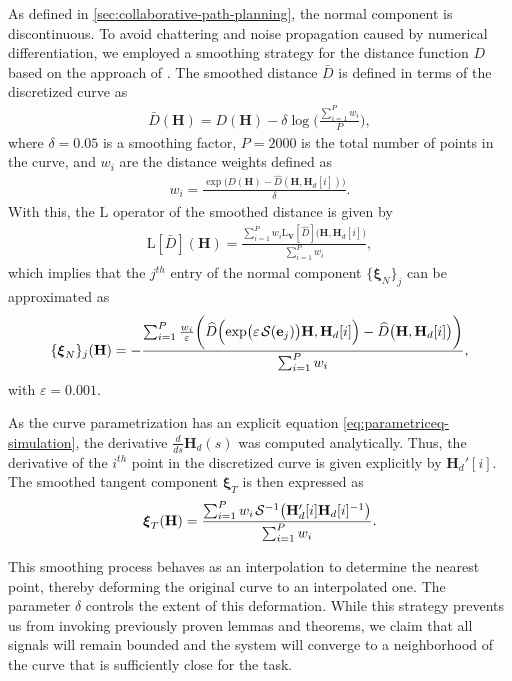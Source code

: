 As defined in \cref{sec:collaborative-path-planning}, the normal component is discontinuous. To avoid chattering and noise propagation caused by numerical differentiation, we employed a smoothing strategy for the distance function $D$ based on the approach of \citet{Goncalves2024}. The smoothed distance $\bar{D}$ is defined in terms of the discretized curve as
\begin{align}
    \bar{D}(\mathbf{H}) = D(\mathbf{H}) - \delta\log\biggl(\frac{\sum_{i=1}^{P}w_i}{P}\biggr),
\end{align}
where $\delta=0.05$ is a smoothing factor, $P=\num{2000}$ is the total number of points in the curve, and $w_i$ are the distance weights defined as
\begin{align}
    w_i = \frac{\exp\bigl(D(\mathbf{H}) - \widehat{D}(\mathbf{H}, \mathbf{H}_d[i])\bigr)}{\delta}.
\end{align}
With this, the $\text{L}$ operator of the smoothed distance is given by
\begin{align}
    \text{L}[\bar{D}](\mathbf{H}) = \frac{\sum_{i=1}^{P}w_i\text{L}_\mathbf{V}[\widehat{D}]\bigl(\mathbf{H}, \mathbf{H}_d[i]\bigr)}{\sum_{i=1}^{P}w_i},
\end{align}
which implies that the $j^{th}$ entry of the normal component $\{\boldsymbol{\xi}_{N}\}_{j}$ can be approximated as
\begin{align}
    \{\boldsymbol{\xi}_{N}\}_{j}(\mathbf{H}) = -\frac{\sum_{i=1}^{P} \frac{w_i}{\varepsilon}\biggl(\widehat{D}\Bigl(\exp\bigl(\varepsilon\SL[\mathbf{e}_j]\bigr)\mathbf{H}, \mathbf{H}_d[i]\Bigr)- \widehat{D}\bigl(\mathbf{H}, \mathbf{H}_d[i]\bigr)\biggr)}{\sum_{i=1}^{P}w_i},
\end{align}
with $\varepsilon=0.001$.

As the curve parametrization has an explicit equation \eqref{eq:parametriceq-simulation}, the derivative $\frac{d}{ds}\mathbf{H}_d(s)$ was computed analytically. Thus, the derivative of the $i^{th}$ point in the discretized curve is given explicitly by $\mathbf{H}_d'[i]$. The smoothed tangent component $\boldsymbol{\xi}_T$ is then expressed as
\begin{align}
    \boldsymbol{\xi}_T(\mathbf{H}) = \frac{\sum_{i=1}^{P} w_i\invSL\bigl(\mathbf{H}_d'[i]\mathbf{H}_d[i]^{-1}\bigr)}{\sum_{i=1}^{P} w_i}.
\end{align}

This smoothing process behaves as an interpolation to determine the nearest point, thereby deforming the original curve to an interpolated one. The parameter $\delta$ controls the extent of this deformation. While this strategy prevents us from invoking previously proven lemmas and theorems, we claim that all signals will remain bounded and the system will converge to a neighborhood of the curve that is sufficiently close for the task.

